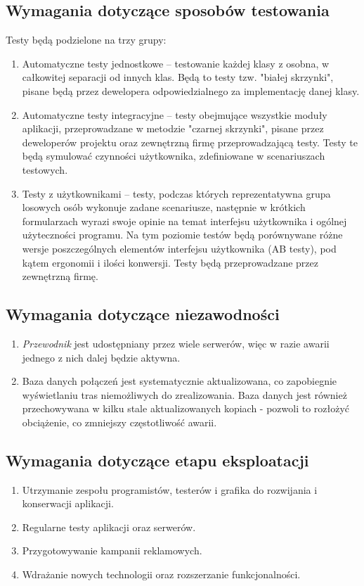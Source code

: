 \documentclass[12pt,a4paper]{report}
\begin{document}
\subsection{Wymagania dotyczące sposobów testowania}
Testy będą podzielone na trzy grupy:
\begin{enumerate}
	\item Automatyczne testy jednostkowe -- testowanie każdej klasy z osobna, w całkowitej separacji od innych klas. Będą to testy tzw. "białej skrzynki", pisane będą przez dewelopera odpowiedzialnego za implementację danej klasy.
	\item Automatyczne testy integracyjne -- testy obejmujące wszystkie moduły aplikacji, przeprowadzane w metodzie "czarnej skrzynki", pisane przez deweloperów projektu oraz zewnętrzną firmę przeprowadzającą testy. Testy te będą symulować czynności użytkownika, zdefiniowane w scenariuszach testowych.
	\item Testy z użytkownikami -- testy, podczas których reprezentatywna grupa losowych osób wykonuje zadane scenariusze, następnie w krótkich formularzach wyrazi swoje opinie na temat interfejsu użytkownika i ogólnej użyteczności programu. Na tym poziomie testów będą porównywane różne wersje poszczególnych elementów interfejsu użytkownika (AB testy), pod kątem ergonomii i ilości konwersji. Testy będą przeprowadzane przez zewnętrzną firmę.
\end{enumerate}
\subsection{Wymagania dotyczące niezawodności}
\begin{enumerate}
	\item \emph{Przewodnik} jest udostępniany przez wiele serwerów, więc w razie awarii jednego z nich dalej będzie aktywna.
	\item Baza danych połączeń jest systematycznie aktualizowana, co zapobiegnie wyświetlaniu tras niemożliwych do zrealizowania. Baza danych jest również przechowywana w kilku stale aktualizowanych kopiach - pozwoli to rozłożyć obciążenie, co zmniejszy częstotliwość awarii.
\end{enumerate}
\subsection{Wymagania dotyczące etapu eksploatacji}
\begin{enumerate}
	\item Utrzymanie zespołu programistów, testerów i grafika do rozwijania i konserwacji aplikacji.
	\item Regularne testy aplikacji oraz serwerów.
	\item Przygotowywanie kampanii reklamowych.
	\item Wdrażanie nowych technologii oraz rozszerzanie funkcjonalności.
\end{enumerate}	
\end{document}
